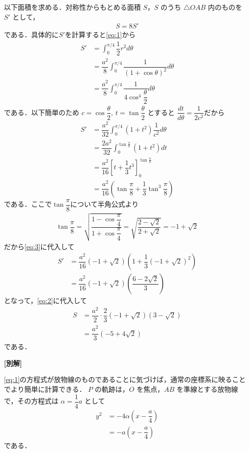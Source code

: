 \documentclass[../../main.tex]{subfiles}
\begin{document}
以下面積を求める．対称性からもとめる面積 $S$，$S$ のうち $\triangle OAB$ 内のものを $S'$ として，
\begin{align}
  S=8S' \label{eq:2}
\end{align}
である．具体的に$S'$を計算すると\cref{eq:1}から
\begin{align}
  S'
  & =\int_0^{\pi/4}\dfrac{1}{2}r^2d\theta \\
  &= \dfrac{a^2}{8}\int_0^{\pi/4}\dfrac{1}{(1+\cos\theta)^2}d\theta \\
  &= \dfrac{a^2}{8}\int_0^{\pi/4}\dfrac{1}{4\cos^4\dfrac{\theta}{2}}d\theta
\end{align}
である．以下簡単のため $c=\cos\dfrac{\theta}{2},\ t=\tan\dfrac{\theta}{2}$ とすると
$\dfrac{dt}{d\theta}=\dfrac{1}{2c^2}$だから
\begin{align}
  S'
  & =\dfrac{a^2}{32}\int_0^{\pi/4}(1+t^2)\dfrac{1}{c^2}d\theta \\
  & =\dfrac{2a^2}{32}\int_0^{\tan\frac{\pi}{8}}(1+t^2)dt \\
  & = \dfrac{a^2}{16}\left[t+\dfrac{1}{3}t^3\right]_0^{\tan\frac{\pi}{8}} \\
  &= \dfrac{a^2}{16}\left(\tan\dfrac{\pi}{8}+\dfrac{1}{3}\tan^3\dfrac{\pi}{8}\right) \label{eq:3}
\end{align}
である．ここで$\tan\dfrac{\pi}{8}$について半角公式より
\begin{align}
  \tan\dfrac{\pi}{8} = \sqrt{\dfrac{1-\cos\dfrac{\pi}{4}}{1+\cos\dfrac{\pi}{4}}} = \sqrt{\dfrac{2-\sqrt{2}}{2+\sqrt{2}}} = -1 + \sqrt{2}
\end{align}
だから\cref{eq:3}に代入して
\begin{align}
  S'
  & =\dfrac{a^2}{16}(-1+\sqrt{2})\left(1+\dfrac{1}{3}(-1+\sqrt{2})^2\right) \\
  &= \dfrac{a^2}{16}(-1+\sqrt{2})\left(\dfrac{6-2\sqrt{2}}{3}\right)
\end{align}
となって，\cref{eq:2}に代入して
\begin{align}
  S
  &=\dfrac{a^2}{2}\cdot\dfrac{2}{3}(-1+\sqrt{2})(3-\sqrt{2}) \\
  &= \dfrac{a^2}{3}(-5+4\sqrt{2})
\end{align}
である．

{\bf [別解]}

\cref{eq:1}の方程式が放物線のものであることに気づけば，通常の座標系に映ることでより簡単に計算できる．
$P$ の軌跡は，$O$ を焦点，$AB$ を準線とする放物線で，その方程式は $\alpha=\dfrac{1}{4} a$ として
\begin{align}
  y^2
  &=-4\alpha\left(x-\dfrac{a}{4}\right)\\
  &=-a\left(x-\dfrac{a}{4}\right)
\end{align}
である．
\end{document}

